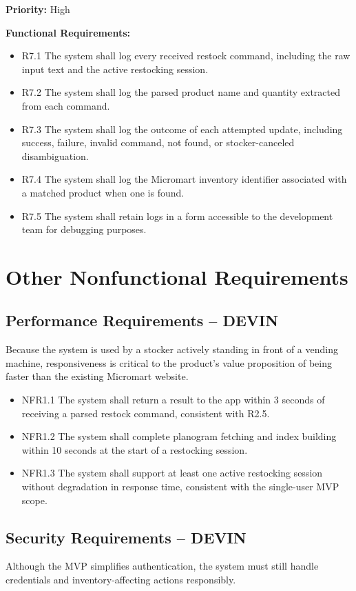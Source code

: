 \documentclass{scrreprt}
\begin{document}
\textbf{Priority:} High

\textbf{Functional Requirements:}
\begin{itemize}
    \item R7.1 The system shall log every received restock command, including the raw input text and the active restocking session.
    \item R7.2 The system shall log the parsed product name and quantity extracted from each command.
    \item R7.3 The system shall log the outcome of each attempted update, including success, failure, invalid command, not found, or stocker-canceled disambiguation.
    \item R7.4 The system shall log the Micromart inventory identifier associated with a matched product when one is found.
    \item R7.5 The system shall retain logs in a form accessible to the development team for debugging purposes.
\end{itemize}

\chapter{Other Nonfunctional Requirements}

\section{Performance Requirements -- DEVIN}
Because the system is used by a stocker actively standing in front of a vending machine, responsiveness is critical to the product's value proposition of being faster than the existing Micromart website.

\begin{itemize}
    \item NFR1.1 The system shall return a result to the app within 3 seconds of receiving a parsed restock command, consistent with R2.5.
    \item NFR1.2 The system shall complete planogram fetching and index building within 10 seconds at the start of a restocking session.
    \item NFR1.3 The system shall support at least one active restocking session without degradation in response time, consistent with the single-user MVP scope.
\end{itemize}

\section{Security Requirements -- DEVIN}
Although the MVP simplifies authentication, the system must still handle credentials and inventory-affecting actions responsibly.
\end{document}
